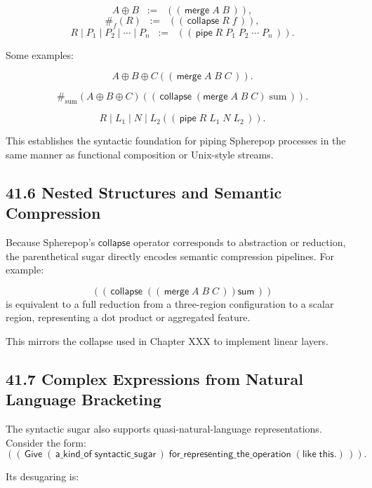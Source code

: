 \documentclass[12pt,letterpaper]{article}
\theoremstyle{remark}
\begin{document}
\[
A \oplus B 
\;\;:=\;\;
((\,\mathsf{merge}\; A\; B\,)),
\]
\[
\#_f(R)
\;\;:=\;\;
((\,\mathsf{collapse}\; R\; f\,)),
\]
\[
R \mid P_1 \mid P_2 \mid \cdots \mid P_n
\;\;:=\;\;
((\,\mathsf{pipe}\; R\; P_1\; P_2\; \cdots\; P_n\,)).
\]

Some examples:

\[
A \oplus B \oplus C
((\,\mathsf{merge}\; A\; B\; C\,)).
\]

\[
\#_{\text{sum}}(A \oplus B \oplus C)
((\,\mathsf{collapse}\; (\mathsf{merge}\; A\; B\; C)\; \text{sum}\,)).
\]

\[
R \mid L_1 \mid N \mid L_2
((\,\mathsf{pipe}\; R\; L_1\; N\; L_2\,)).
\]

This establishes the syntactic foundation for piping Spherepop processes in the same manner as functional composition or Unix-style streams.

\subsection{41.6 Nested Structures and Semantic Compression}

Because Spherepop's $\mathsf{collapse}$ operator corresponds to abstraction or reduction, the parenthetical sugar directly encodes semantic compression pipelines. For example:

\[
((\,\mathsf{collapse}\;
     ((\,\mathsf{merge}\; A\; B\; C\,))
     \mathsf{sum}\,))
\]
is equivalent to a full reduction from a three-region configuration to a scalar region, representing a dot product or aggregated feature.

This mirrors the collapse used in Chapter XXX to implement linear layers.

\subsection{41.7 Complex Expressions from Natural Language Bracketing}

The syntactic sugar also supports quasi-natural-language representations. Consider the form:
\[
((\,\mathsf{Give}\;
       (\,\mathsf{a\_kind\_of}\;\mathsf{syntactic\_sugar}\,)\;
       \mathsf{for\_representing\_the\_operation}\;
       (\mathsf{like}\;\mathsf{this.})\,)).
\]

Its desugaring is:
\end{document}
